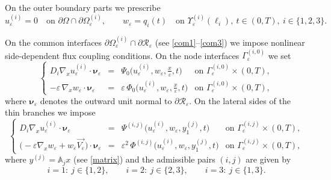 \documentclass[reqno]{amsart}            %
\numberwithin{equation}{section}
\begin{document}
	On the outer boundary parts we prescribe
	\begin{equation}\label{p-outer-bc}
		u_\varepsilon^{(i)} = 0
		\quad \text{on } \partial\Omega\cap\partial\Omega_\varepsilon^{(i)},
		\qquad
		w_\varepsilon = q_i(t)
		\quad \text{on } \Upsilon_\varepsilon^{(i)}(\ell_i),\ t\in(0,T),\ i\in\{1,2,3\}.
	\end{equation}
	
	On the common interfaces $\partial\Omega_\varepsilon^{(i)}\cap\partial\mathcal{R}_\varepsilon$
	(see \eqref{com1}–\eqref{com3}) we impose nonlinear side-dependent flux coupling
	conditions. On the node interfaces $\Gamma_\varepsilon^{(i,0)}$ we set
	\begin{equation}\label{coup-1}
		\left\{
		\begin{array}{rcll}
			D_i \nabla_x u^{(i)}_{\varepsilon} \cdot \boldsymbol{\nu}_\varepsilon
			&=& \Psi_0\big(u^{(i)}_{\varepsilon}, w_{\varepsilon}, \tfrac{x}{\varepsilon}, t\big)
			& \text{on } \Gamma^{(i,0)}_\varepsilon\times(0,T),
			\\[2mm]
			-\varepsilon\,\nabla_x w_{\varepsilon} \cdot \boldsymbol{\nu}_\varepsilon
			&=& \varepsilon\,\Phi_0\big(u^{(i)}_{\varepsilon}, w_{\varepsilon}, \tfrac{x}{\varepsilon}, t\big)
			& \text{on } \Gamma^{(i,0)}_\varepsilon\times(0,T),
		\end{array}
		\right.
	\end{equation}
	where $\boldsymbol{\nu}_\varepsilon$ denotes the outward unit normal to
	$\partial\mathcal{R}_\varepsilon$.
	On the lateral sides of the thin branches  we impose
	\begin{equation}\label{coupl-1+}
		\left\{
		\begin{array}{rcll}
			D_i \nabla_x u^{(i)}_{\varepsilon} \cdot \boldsymbol{\nu}_\varepsilon
			&=& \Psi^{(i,j)}\big(u^{(i)}_{\varepsilon}, w_{\varepsilon}, y^{(j)}_1, t\big)
			& \text{on } \Gamma^{(i,j)}_\varepsilon\times(0,T),
			\\[2mm]
			\big(-\varepsilon \nabla_x w_\varepsilon + w_\varepsilon \overrightarrow{V_\varepsilon}\big)
			\cdot \boldsymbol{\nu}_\varepsilon
			&=& \varepsilon^2\,\Phi^{(i,j)}\big(u^{(i)}_{\varepsilon}, w_{\varepsilon}, y^{(j)}_1, t\big)
			& \text{on } \Gamma^{(i,j)}_\varepsilon\times(0,T),
		\end{array}
		\right.
	\end{equation}
	where $y^{(j)}=\mathbb{A}_j x$ (see \eqref{matrix}) and the admissible pairs
	$(i,j)$ are given by
	\begin{equation}\label{indexes}
		i=1:\ j\in\{1,2\},\qquad
		i=2:\ j\in\{2,3\},\qquad
		i=3:\ j\in\{1,3\}.
	\end{equation}
	
\end{document}
